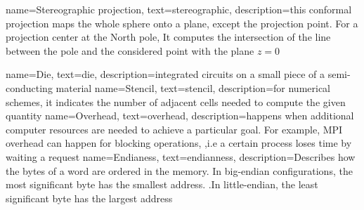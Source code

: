 {
  name={Stereographic projection},
  text={stereographic},
  description={this conformal projection maps the whole sphere onto a plane, except the
  projection point. For a projection center at the North pole, It computes the
  intersection of the line between the pole and the considered point with the
  plane $z=0$}
}
%
%
%

{
  name={Die},
  text={die},
  description={integrated circuits on a small piece of a semi-conducting
  material}
}
{
  name={Stencil},
  text={stencil},
  description={for numerical schemes, it indicates the number of adjacent cells
  needed to compute the given quantity}
}
{
  name={Overhead},
  text={overhead},
  description={happens when additional computer resources are needed to achieve a
  particular goal. For example, MPI overhead can happen for blocking operations,
  ,i.e a certain process loses time by waiting a request} 
}
{
  name={Endianess},
  text={endianness},
  description={Describes how the bytes of a word are ordered in the memory. In
  big-endian configurations, the most significant byte has the smallest address.
  .In little-endian, the least significant byte has the largest address}
}

